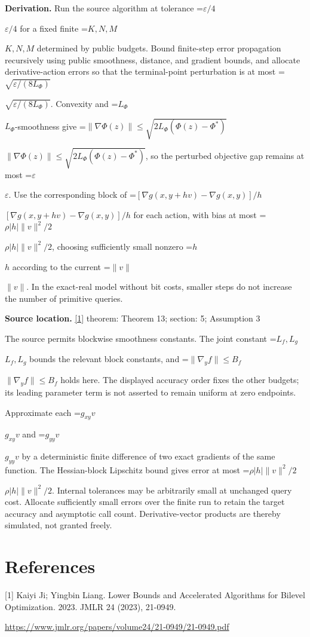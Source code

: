\documentclass[10pt,a4paper]{article}
\newcommand{\AtlasMath}[1]{\par\begingroup\centering\setbox0=\hbox{$\displaystyle #1$}\ifdim\wd0>1.4\linewidth\typeout{ATLAS WIDE FORMULA: \the\wd0}\fi\ifdim\wd0>\linewidth\resizebox{\linewidth}{!}{\box0}\else\box0\fi\par\endgroup}
\newcommand{\AtlasInlineMath}[1]{\begingroup\setbox0=\hbox{$#1$}\ifdim\wd0>.4\linewidth\endgroup\AtlasMath{#1}\else\endgroup$#1$\fi}
\begin{document}
\textbf{Derivation.} Run the source algorithm at tolerance \AtlasInlineMath{\varepsilon/4} for a fixed finite \AtlasInlineMath{K,N,M} determined by public budgets. Bound finite-step error propagation recursively using public smoothness, distance, and gradient bounds, and allocate derivative-action errors so that the terminal-point perturbation is at most \AtlasInlineMath{\sqrt{\varepsilon/(8L_\Phi)}}. Convexity and \AtlasInlineMath{L_\Phi}-smoothness give \AtlasInlineMath{\|\nabla\Phi(z)\|\le\sqrt{2L_\Phi(\Phi(z)-\Phi^*)}}, so the perturbed objective gap remains at most \AtlasInlineMath{\varepsilon}. Use the corresponding block of \AtlasInlineMath{[\nabla g(x,y+hv)-\nabla g(x,y)]/h} for each action, with bias at most \AtlasInlineMath{\rho|h|\|v\|^2/2}, choosing sufficiently small nonzero \AtlasInlineMath{h} according to the current \AtlasInlineMath{\|v\|}. In the exact-real model without bit costs, smaller steps do not increase the number of primitive queries.

\textbf{Source location.} \href{https://www.jmlr.org/papers/volume24/21-0949/21-0949.pdf}{[1]} theorem: Theorem 13; section: 5; Assumption 3

The source permits blockwise smoothness constants. The joint constant \AtlasInlineMath{L_f,L_g} bounds the relevant block constants, and \AtlasInlineMath{\|\nabla_yf\|\le B_f} holds here. The displayed accuracy order fixes the other budgets; its leading parameter term is not asserted to remain uniform at zero endpoints.

Approximate each \AtlasInlineMath{g_{xy}v} and \AtlasInlineMath{g_{yy}v} by a deterministic finite difference of two exact gradients of the same function. The Hessian-block Lipschitz bound gives error at most \AtlasInlineMath{\rho |h|\|v\|^2/2}. Internal tolerances may be arbitrarily small at unchanged query cost. Allocate sufficiently small errors over the finite run to retain the target accuracy and asymptotic call count. Derivative-vector products are thereby simulated, not granted freely.

\section{References}
[1] Kaiyi Ji; Yingbin Liang. Lower Bounds and Accelerated Algorithms for Bilevel Optimization. 2023. JMLR 24 (2023), 21-0949.

\url{https://www.jmlr.org/papers/volume24/21-0949/21-0949.pdf}
\end{document}
